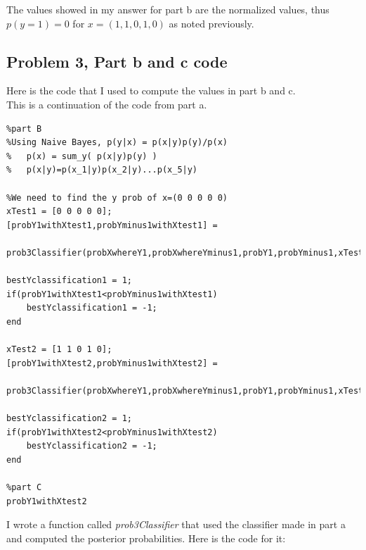 \documentclass[11pt,psfig]{article}
\begin{document}
The values showed in my answer for part b are the normalized values, thus \\
$p(y=1)=0$ for $x=(1,1,0,1,0)$ as noted previously.

\subsection*{Problem 3, Part b and c code}

Here is the code that I used to compute the values in part b and c. \\
This is a continuation of the code from part a.

\begin{verbatim}
%part B
%Using Naive Bayes, p(y|x) = p(x|y)p(y)/p(x)
%   p(x) = sum_y( p(x|y)p(y) )
%   p(x|y)=p(x_1|y)p(x_2|y)...p(x_5|y)

%We need to find the y prob of x=(0 0 0 0 0)
xTest1 = [0 0 0 0 0];
[probY1withXtest1,probYminus1withXtest1] = 
    prob3Classifier(probXwhereY1,probXwhereYminus1,probY1,probYminus1,xTest1);

bestYclassification1 = 1;
if(probY1withXtest1<probYminus1withXtest1)
    bestYclassification1 = -1; 
end

xTest2 = [1 1 0 1 0];
[probY1withXtest2,probYminus1withXtest2] = 
    prob3Classifier(probXwhereY1,probXwhereYminus1,probY1,probYminus1,xTest2);

bestYclassification2 = 1;
if(probY1withXtest2<probYminus1withXtest2)
    bestYclassification2 = -1; 
end

%part C
probY1withXtest2
\end{verbatim}

\newpage

I wrote a function called {\it prob3Classifier} that used the classifier made in part a \\
and computed the posterior probabilities. Here is the code for it:
\end{document}
